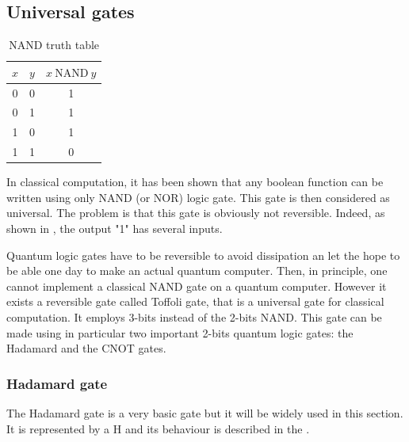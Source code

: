 \documentclass[twoside, open=right
]{scrreprt}
\begin{document}
\subsection{Universal gates}

\begin{table}
  \vspace{-10pt}
  \centering
  \begin{tabular}{||c|c||c||}
    \hline
    $x$ & $y$ & $x\ \mathrm{NAND} \ y$\\
    \hline \hline
    0 & 0 & 1\\
    0 & 1 & 1\\
    1 & 0 & 1\\
    1 & 1 & 0\\
    \hline
  \end{tabular}
  \caption{\label{NAND-tab} NAND truth table}
  \vspace{-10pt}
\end{table}

\par In classical computation, it has been shown that any boolean function can be written using only NAND (or NOR) logic gate. This gate is then considered as universal. The problem is that this gate is obviously not reversible. Indeed, as shown in , the output "1" has several inputs.
\par Quantum logic gates  have to be reversible to avoid dissipation an let the hope to be able one day to make an actual quantum computer. Then, in principle, one cannot implement a classical NAND gate on a quantum computer. However it exists a reversible gate called Toffoli gate, that is a universal gate for classical computation. It employs 3-bits instead of the 2-bits NAND. This gate can be made using in particular two important 2-bits quantum logic gates: the Hadamard and the CNOT gates.

\subsubsection{Hadamard gate}

The Hadamard gate is a very basic gate but it will be widely used in this section. It is represented by a H and its behaviour is described in the .
\end{document}
